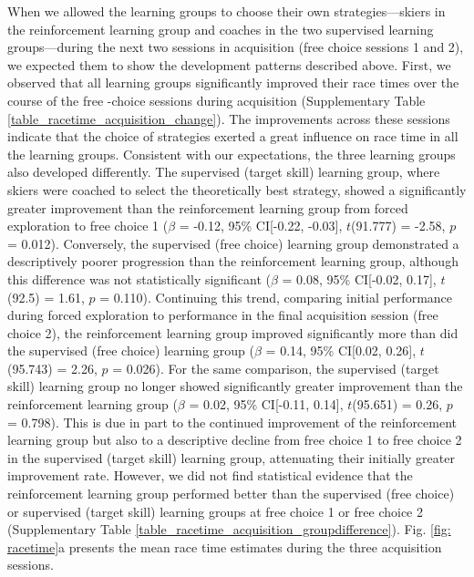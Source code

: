 When we allowed the learning groups to choose their own strategies—skiers in the reinforcement learning group and coaches in the two supervised learning groups—during the next two sessions in acquisition (free choice sessions 1 and 2), we expected them to show the development patterns described above. First, we observed that all learning groups significantly improved their race times over the course of the free -choice sessions during acquisition (Supplementary Table \ref{table_racetime_acquisition_change}). The improvements across these sessions indicate that the choice of strategies exerted a great influence on race time in all the learning groups. Consistent with our expectations, the three learning groups also developed differently. The supervised (target skill) learning group, where skiers were coached to select the theoretically best strategy, showed a significantly greater improvement than the reinforcement learning group from forced exploration to free choice 1 ($\beta$ = -0.12, 95\% CI[-0.22, -0.03], $t$(91.777) = -2.58, $p$ = 0.012). Conversely, the supervised (free choice) learning group demonstrated a descriptively poorer progression than the reinforcement learning group, although this difference was not statistically significant ($\beta$ = 0.08, 95\% CI[-0.02, 0.17], $t$(92.5) = 1.61, $p$ = 0.110). Continuing this trend, comparing initial performance during forced exploration to performance in the final acquisition session (free choice 2), the reinforcement learning group improved significantly more than did the supervised (free choice) learning group ($\beta$ = 0.14, 95\% CI[0.02, 0.26], $t$(95.743) = 2.26, $p$ = 0.026). For the same comparison, the supervised (target skill) learning group no longer showed significantly greater improvement than the reinforcement learning group  ($\beta$ = 0.02, 95\% CI[-0.11, 0.14], $t$(95.651) = 0.26, $p$ = 0.798). This is due in part to the continued improvement of the reinforcement learning group but also to a descriptive decline from free choice 1 to free choice 2 in the supervised (target skill) learning group, attenuating their initially greater improvement rate. However, we did not find statistical evidence that the reinforcement learning group performed better than the supervised (free choice) or supervised (target skill) learning groups at free choice 1 or free choice 2 (Supplementary Table \ref{table_racetime_acquisition_groupdifference}). Fig. \ref{fig: racetime}a presents the mean race time estimates during the three acquisition sessions. 

